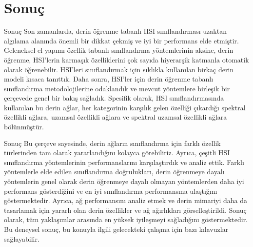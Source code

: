 \documentclass{beamer}
\begin{document}
\section{Sonuç}
\begin{frame}{Sonuç}
  Son zamanlarda, derin öğrenme tabanlı HSI sınıflandırması uzaktan algılama alanında önemli bir dikkat çekmiş ve iyi bir performans elde etmiştir. Geleneksel el yapımı özellik tabanlı sınıflandırma yöntemlerinin aksine, derin öğrenme, HSI’lerin karmaşık özelliklerini çok sayıda hiyerarşik katmanla otomatik olarak öğrenebilir. HSI'leri sınıflandırmak için sıklıkla kullanılan birkaç derin modeli kısaca tanıttık. Daha sonra, HSI’ler için derin öğrenme tabanlı sınıflandırma metodolojilerine odaklandık ve mevcut yöntemlere birleşik bir çerçevede genel bir bakış sağladık. Spesifik olarak, HSI sınıflandırmasında kullanılan bu derin ağlar, her kategorinin karşılık gelen özelliği çıkardığı spektral özellikli ağlara, uzamsal özellikli ağlara ve spektral uzamsal özellikli ağlara bölünmüştür. 
\end{frame}

\begin{frame}{Sonuç}
  Bu çerçeve sayesinde, derin ağların sınıflandırma için farklı özellik türlerinden tam olarak yararlandığını kolayca görebiliriz. Ayrıca, çeşitli HSI sınıflandırma yöntemlerinin performanslarını karşılaştırdık ve analiz ettik. Farklı yöntemlerle elde edilen sınıflandırma doğrulukları, derin öğrenmeye dayalı yöntemlerin genel olarak derin öğrenmeye dayalı olmayan yöntemlerden daha iyi performans gösterdiğini ve en iyi sınıflandırma performansına ulaştığını göstermektedir. Ayrıca, ağ performansını analiz etmek ve derin mimariyi daha da tasarlamak için yararlı olan derin özellikler ve ağ ağırlıkları görselleştirildi. Sonuç olarak, tüm yaklaşımlar arasında en yüksek iyileşmeyi sağladığını göstermektedir. Bu deneysel sonuç, bu konuyla ilgili gelecekteki çalışma için bazı kılavuzlar sağlayabilir. 
\end{frame}
\end{document}
